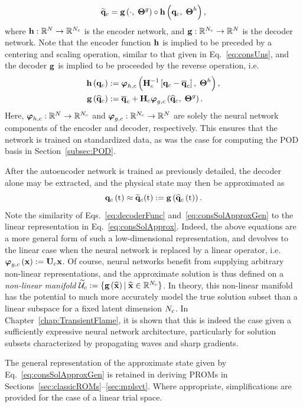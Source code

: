 %
\begin{equation}
    \mathbf{\widetilde{q}}_{c} = \mathbf{g} \left(\cdot, \; \boldsymbol{\Theta}^{g}\right) \circ \mathbf{h} \left(\mathbf{q}_{c}, \; \boldsymbol{\Theta}^{h}\right),
\end{equation}
%
where $\mathbf{h}: \mathbb{R}^{N} \rightarrow \mathbb{R}^{N_c}$ is the encoder network, and $\mathbf{g}: \mathbb{R}^{N_c} \rightarrow \mathbb{R}^{N}$ is the decoder network. Note that the encoder function $\mathbf{h}$ is implied to be preceded by a centering and scaling operation, similar to that given in Eq.~\ref{eq:consUns}, and the decoder $\mathbf{g}$ is implied to be proceeded by the reverse operation, i.e.
%
\begin{align}
    \encoderFunc{\consVec} &\defEq \nnLayer_{\encoderVar,\consVar} \left(\consScaleInv\left[\consVec - \consVecCent\right], \; \nnParams^{\encoderVar}\right), \\
    \decoderFunc{\consVecCoef} &\defEq \consVecCent + \consScale \trialConsFunc{\consVecCoef, \; \nnParams^{\decoderVar}}. \label{eq:decoderFunc}
\end{align}
%
Here, $\boldsymbol{\varphi}_{h,c}: \mathbb{R}^{N} \rightarrow \mathbb{R}^{N_c}$ and $\boldsymbol{\varphi}_{g, c}: \mathbb{R}^{N_c} \rightarrow \mathbb{R}^{N}$ are solely the neural network components of the encoder and decoder, respectively. This ensures that the network is trained on standardized data, as was the case for computing the POD basis in Section~\ref{subsec:POD}.

After the autoencoder network is trained as previously detailed, the decoder alone may be extracted, and the physical state may then be approximated as
%
\begin{equation}\label{eq:consSolApproxGen}
    \mathbf{q}_{c}\left(\text{t}\right) \approx \mathbf{\widetilde{q}}_{c}(\text{t}) := \mathbf{g} \left(\mathbf{\widehat{q}}_{c}\left(\text{t}\right)\right).
\end{equation}
%
Note the similarity of Eqs.~\ref{eq:decoderFunc} and~\ref{eq:consSolApproxGen} to the linear representation in Eq.~\ref{eq:consSolApprox}. Indeed, the above equations are a more general form of such a low-dimensional representation, and devolves to the linear case when the neural network is replaced by a linear operator, i.e. $\trialConsFunc{\nnInput} \defEq \consTrial \nnInput$. Of course, neural networks benefit from supplying arbitrary non-linear representations, and the approximate solution is thus defined on a \textit{non-linear manifold} $\consTrialSpace \defEq \{\decoderFunc{\nnInputCoef} \vert \; \nnInputCoef \inROne{\numConsModes} \}$. In theory, this non-linear manifold has the potential to much more accurately model the true solution subset than a linear subspace for a fixed latent dimension $N_c$. In Chapter~\ref{chap:TransientFlame}, it is shown that this is indeed the case given a sufficiently expressive neural network architecture, particularly for solution subsets characterized by propagating waves and sharp gradients.

The general representation of the approximate state given by Eq.~\ref{eq:consSolApproxGen} is retained in deriving PROMs in Sections~\ref{sec:classicROMs}--\ref{sec:mplsvt}. Where appropriate, simplifications are provided for the case of a linear trial space.

